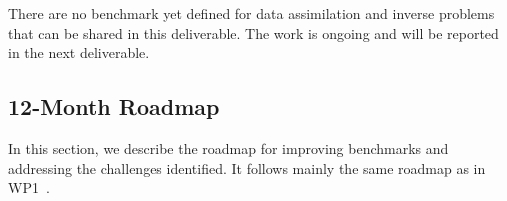 
There are no benchmark yet defined for data assimilation and inverse problems that can be shared in this deliverable. 
The work is ongoing and will be reported in the next deliverable.

\subsection{12-Month Roadmap}
\label{sec:WP4:Feel++:roadmap}

In this section, we describe the roadmap for improving benchmarks and addressing the challenges identified. 
It follows mainly the same roadmap as in WP1~.


